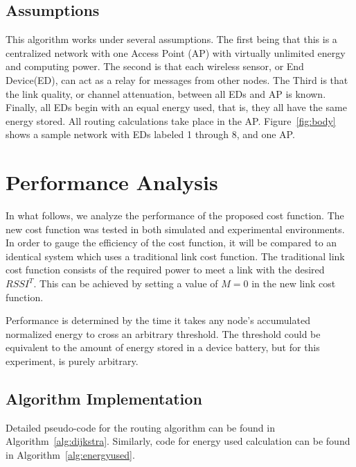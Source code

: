\documentclass{article}
\begin{document}
\subsection{Assumptions}
This algorithm works under several assumptions. The first being that this is a centralized network with one Access Point (AP) with virtually unlimited energy and computing power. The second is that each wireless sensor, or End Device(ED), can act as a relay for messages from other nodes. The Third is that the link quality, or channel attenuation, between all EDs and AP is known. Finally, all EDs begin with an equal energy used, that is, they all have the same energy stored. All routing calculations take place in the AP. Figure~\ref{fig:body} shows a sample network with EDs labeled 1 through 8, and one AP.

\section{Performance Analysis}
In what follows, we analyze the performance of the proposed cost function. The new cost function was tested in both simulated and experimental environments. In order to gauge the efficiency of the cost function, it will be compared to an identical system which uses a traditional link cost function. The traditional link cost function consists of the required power to meet a link with the desired $RSSI^T$. This can be achieved by setting a value of $M=0$ in the new link cost function.

Performance is determined by the time it takes any node's accumulated normalized energy to cross an arbitrary threshold. The threshold could be equivalent to the amount of energy stored in a device battery, but for this experiment, is purely arbitrary. 

\subsection{Algorithm Implementation}
Detailed pseudo-code for the routing algorithm can be found in Algorithm~\ref{alg:dijkstra}. Similarly, code for energy used calculation can be found in Algorithm~\ref{alg:energyused}.
\end{document}
